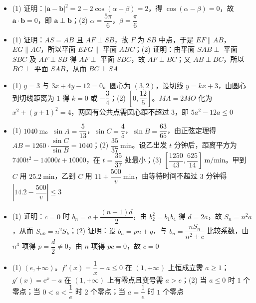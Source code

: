 \begin{itemize}[leftmargin=2.6em]
  \item[\textbf{15.}] (1) 证明：$|\boldsymbol a-\boldsymbol b|^2=2-2\cos(\alpha-\beta)=2$，得 $\cos(\alpha-\beta)=0$，故 $\boldsymbol a\cdot\boldsymbol b=0$，即 $\boldsymbol a\perp\boldsymbol b$；(2) $\alpha=\dfrac{5\pi}{6}$，$\beta=\dfrac{\pi}{6}$
  \item[\textbf{16.}] (1) 证明：$AS=AB$ 且 $AF\perp SB$，故 $F$ 为 $SB$ 中点，于是 $EF\parallel AB$，$EG\parallel AC$，所以平面 $EFG\parallel$ 平面 $ABC$；(2) 证明：由平面 $SAB\perp$ 平面 $SBC$ 及 $AF\perp SB$ 得 $AF\perp$ 平面 $SBC$，故 $AF\perp BC$；又 $AB\perp BC$，所以 $BC\perp$ 平面 $SAB$，从而 $BC\perp SA$
  \item[\textbf{17.}] (1) $y=3$ 与 $3x+4y-12=0$。圆心为 $(3,2)$，设切线 $y=kx+3$，由圆心到切线距离为 $1$ 得 $k=0$ 或 $-\dfrac34$；(2) $\left[0,\dfrac{12}{5}\right]$。$MA=2MO$ 化为 $x^2+(y+1)^2=4$，两圆有公共点需圆心距不超过 $3$，即 $5a^2-12a\leqslant0$
  \item[\textbf{18.}] (1) $1040\ \mathrm m$。$\sin A=\dfrac5{13}$，$\sin C=\dfrac45$，$\sin B=\dfrac{63}{65}$，由正弦定理得 $AB=1260\cdot\dfrac{\sin C}{\sin B}=1040$；(2) $\dfrac{35}{37}\ \mathrm{min}$。设乙出发 $t$ 分钟后，距离平方为 $7400t^2-14000t+10000$，在 $t=\dfrac{35}{37}$ 处最小；(3) $\left[\dfrac{1250}{43},\dfrac{625}{14}\right]\ \mathrm{m/min}$。甲到 $C$ 用 $25.2\ \mathrm{min}$，乙到 $C$ 用 $11+\dfrac{500}{v}\ \mathrm{min}$，由等待时间不超过 $3$ 分钟得 $\left|14.2-\dfrac{500}{v}\right|\leqslant3$
  \item[\textbf{19.}] (1) 证明：$c=0$ 时 $b_n=a+\dfrac{(n-1)d}{2}$，由 $b_2^2=b_1b_4$ 得 $d=2a$，故 $S_n=n^2a$，从而 $S_{nk}=n^2S_k$；(2) 证明：设 $b_n=pn+q$，与 $b_n=\dfrac{nS_n}{n^2+c}$ 比较系数，由 $n^3$ 项得 $p=\dfrac d2\neq0$，由 $n$ 项得 $pc=0$，故 $c=0$
  \item[\textbf{20.}] (1) $(e,+\infty)$。$f'(x)=\dfrac1x-a\leqslant0$ 在 $(1,+\infty)$ 上恒成立需 $a\geqslant1$；$g'(x)=\mathrm e^x-a$ 在 $(1,+\infty)$ 上有零点且变号需 $a>e$；(2) 当 $a\leqslant0$ 时 $1$ 个零点；当 $0<a<\dfrac1e$ 时 $2$ 个零点；当 $a=\dfrac1e$ 时 $1$ 个零点
\end{itemize}

